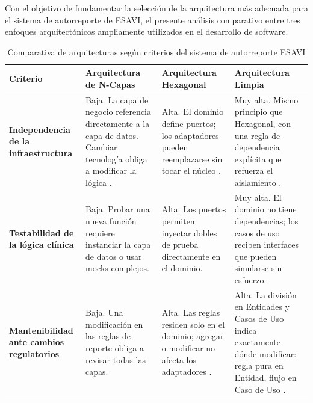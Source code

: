 


Con el objetivo de fundamentar la selección de la arquitectura más adecuada para el sistema de autorreporte de ESAVI, el presente análisis comparativo entre tres enfoques arquitectónicos ampliamente utilizados en el desarrollo de software.

\begin{table}[H]
\centering
\caption{Comparativa de arquitecturas según criterios del sistema de autorreporte ESAVI}
\label{tab:comparativa_esavi}
\begin{tabular}{|p{3.8cm}|p{3.8cm}|p{3.8cm}|p{3.8cm}|}
\hline
\textbf{Criterio} & \textbf{Arquitectura de N-Capas} & \textbf{Arquitectura Hexagonal} & \textbf{Arquitectura Limpia} \\
\hline
\textbf{Independencia de la infraestructura} & 
Baja. La capa de negocio referencia directamente a la capa de datos. Cambiar tecnología obliga a modificar la lógica \cite{microsoft_arch}. & 
Alta. El dominio define puertos; los adaptadores pueden reemplazarse sin tocar el núcleo \cite{cockburn2005}. & 
Muy alta. Mismo principio que Hexagonal, con una regla de dependencia explícita que refuerza el aislamiento \cite{martin2018}. \\
\hline
\textbf{Testabilidad de la lógica clínica} & 
Baja. Probar una nueva función requiere instanciar la capa de datos o usar mocks complejos. & 
Alta. Los puertos permiten inyectar dobles de prueba directamente en el dominio. & 
Muy alta. El dominio no tiene dependencias; los casos de uso reciben interfaces que pueden simularse sin esfuerzo. \\
\hline
\textbf{Mantenibilidad ante cambios regulatorios} & 
Baja. Una modificación en las reglas de reporte obliga a revisar todas las capas. & 
Alta. Las reglas residen solo en el dominio; agregar o modificar no afecta los adaptadores \cite{cockburn2005}. & 
Alta. La división en Entidades y Casos de Uso indica exactamente dónde modificar: regla pura en Entidad, flujo en Caso de Uso \cite{martin2018}.\\
\hline
\end{tabular}
\end{table}

